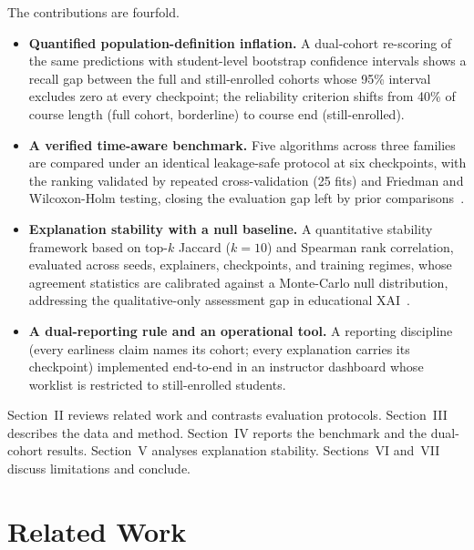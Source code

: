 \documentclass[conference]{IEEEtran}
\begin{document}
The contributions are fourfold.
\begin{itemize}
\item \textbf{Quantified population-definition inflation.} A dual-cohort
re-scoring of the same predictions with student-level bootstrap confidence
intervals shows a recall gap between the full and still-enrolled cohorts
whose 95\% interval excludes zero at every checkpoint; the reliability
criterion shifts from 40\% of course length (full cohort, borderline) to
course end (still-enrolled).
\item \textbf{A verified time-aware benchmark.} Five algorithms across three
families are compared under an identical leakage-safe protocol at six
checkpoints, with the ranking validated by repeated cross-validation (25
fits) and Friedman and Wilcoxon-Holm testing, closing the evaluation gap
left by prior comparisons~\cite{tomasevic2020}.
\item \textbf{Explanation stability with a null baseline.} A quantitative
stability framework based on top-$k$ Jaccard ($k=10$) and Spearman rank
correlation, evaluated across seeds, explainers, checkpoints, and training
regimes, whose agreement statistics are calibrated against a Monte-Carlo
null distribution, addressing the qualitative-only assessment gap in
educational XAI~\cite{alamri2021,gunasekara2025}.
\item \textbf{A dual-reporting rule and an operational tool.} A reporting
discipline (every earliness claim names its cohort; every explanation
carries its checkpoint) implemented end-to-end in an instructor dashboard
whose worklist is restricted to still-enrolled students.
\end{itemize}

Section~II reviews related work and contrasts evaluation protocols.
Section~III describes the data and method. Section~IV reports the benchmark
and the dual-cohort results. Section~V analyses explanation stability.
Sections~VI and~VII discuss limitations and conclude.

\section{Related Work}
\end{document}
